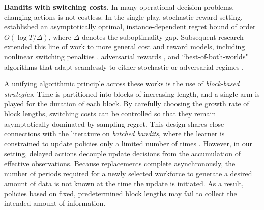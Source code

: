 \documentclass[opre,blindrev]{informs3}
\begin{document}
{\bf Bandits with switching costs.}
In many operational decision problems, changing actions is not costless. In the single-play, stochastic-reward setting, \cite{agrawal1988asymptswithcing} established an asymptotically optimal, instance-dependent regret bound of order \(O(\log T / \Delta)\), where \(\Delta\) denotes the suboptimality gap. Subsequent research extended this line of work to more general cost and reward models, including nonlinear switching penalties \citep{guha2009multi}, adversarial rewards \citep{cesa2013online}, and ``best-of-both-worlds" algorithms that adapt seamlessly to either stochastic or adversarial regimes \citep{dekel2014bandits, rouyer2021algorithm, amir2022better}. 

A unifying algorithmic principle across these works is the use of \emph{block-based strategies}. Time is partitioned into blocks of increasing length, and a single arm is played for the duration of each block. By carefully choosing the growth rate of block lengths, switching costs can be controlled so that they remain asymptotically dominated by sampling regret. This design shares close connections with the literature on \emph{batched bandits}, where the learner is constrained to update policies only a limited number of times \citep{agrawal1990switching, gao2019batched, esfandiari2021regret, jin2021almost}. However, in our setting, delayed actions decouple update decisions from the accumulation of effective observations. Because replacements complete asynchronously, the number of periods required for a newly selected workforce to generate a desired amount of data is not known at the time the update is initiated. As a result, policies based on fixed, predetermined block lengths may fail to collect the intended amount of information. 

\end{document}
